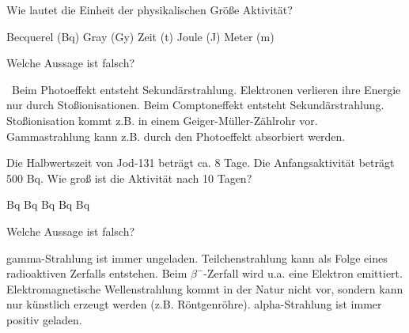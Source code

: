 \documentclass[11pt]{exam}
\begin{document}
\setlength{\voffset}{-0.5in}
\setlength{\headsep}{5pt}

\hspace{2mm}
 \hspace{5mm}
\vspace{4mm}

\begin{questions}

\question Wie lautet die Einheit der physikalischen Größe Aktivität?

\begin{choices}
	\choice Becquerel (Bq)
	\choice Gray (Gy)
	\choice Zeit (t)
	\choice Joule (J)
	\choice Meter (m)
\end{choices}

\vspace{3mm}\question Welche Aussage ist falsch?

\begin{choices}
	\choice  Beim Photoeffekt entsteht Sekundärstrahlung.
	\choice Elektronen verlieren ihre Energie nur durch Stoßionisationen.
	\choice Beim Comptoneffekt entsteht Sekundärstrahlung.
	\choice Stoßionisation kommt z.B. in einem Geiger-Müller-Zählrohr vor.
	\choice Gammastrahlung kann z.B. durch den Photoeffekt absorbiert werden.
\end{choices}

\vspace{3mm}\question Die Halbwertszeit von Jod-131 beträgt ca. 8 Tage. Die Anfangsaktivität beträgt 500 Bq. Wie groß ist die Aktivität nach 10 Tagen?

\begin{choices}
	 Bq
	 Bq
	 Bq
	 Bq
	 Bq
\end{choices}

\vspace{3mm}\question Welche Aussage ist falsch?

\begin{choices}
	\choice gamma-Strahlung ist immer ungeladen.
	\choice Teilchenstrahlung kann als Folge eines radioaktiven Zerfalls entstehen.
	\choice Beim \( \beta^- \)-Zerfall wird u.a. eine Elektron emittiert.
	\choice Elektromagnetische Wellenstrahlung kommt in der Natur nicht vor, sondern kann nur künstlich erzeugt werden (z.B. Röntgenröhre).
	\choice alpha-Strahlung ist immer positiv geladen.
\end{choices}


\end{questions}
\end{document}
